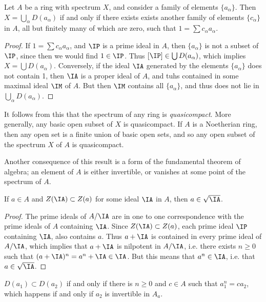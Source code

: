 \begin{lemma}
    Let $A$ be a ring with spectrum $X$, and consider a family of elements $\{ a_\alpha \}$. Then $X = \bigcup_\alpha D(a_\alpha)$ if and only if there exists exists another family of elements $\{ c_\alpha \}$ in $A$, all but finitely many of which are zero, such that $1 = \sum c_\alpha a_\alpha$.
\end{lemma}
\begin{proof}
    If $1 = \sum c_\alpha a_\alpha$, and $\IP$ is a prime ideal in $A$, then $\{ a_\alpha \}$ is not a subset of $\IP$, since then we would find $1 \in \IP$. Thus $[\IP] \in \bigcup D(a_\alpha)$, which implies $X = \bigcup D(a_\alpha)$. Conversely, if the ideal $\IA$ generated by the elements $\{ a_\alpha \}$ does not contain 1, then $\IA$ is a proper ideal of $A$, and tuhs contained in some maximal ideal $\IM$ of $A$. But then $\IM$ contains all $\{ a_\alpha \}$, and thus does not lie in $\bigcup_\alpha D(a_\alpha)$.
\end{proof}

\begin{remark}
    It follows from this that the spectrum of any ring is \emph{quasicompact}. More generally, any basic open subset of $X$ is quasicompact. If $A$ is a Noetherian ring, then any open set is a finite union of basic open sets, and so any open subset of the spectrum $X$ of $A$ is quasicompact. 

    Another consequence of this result is a form of the fundamental theorem of algebra; an element of $A$ is either invertible, or vanishes at some point of the spectrum of $A$.
\end{remark}

\begin{lemma}
    If $a \in A$ and $Z(\IA) \subset Z(a)$ for some ideal $\IA$ in $A$, then $a \in \sqrt{\IA}$.
\end{lemma}
\begin{proof}
    The prime ideals of $A/\IA$ are in one to one correspondence with the prime ideals of $A$ containing $\IA$. Since $Z(\IA) \subset Z(a)$, each prime ideal $\IP$ containing $\IA$, also contains $a$. Thus $a + \IA$ is contained in every prime ideal of $A/\IA$, which implies that $a + \IA$ is nilpotent in $A/\IA$, i.e. there exists $n \geq 0$ such that $(a + \IA)^n = a^n + \IA \in \IA$. But this means that $a^n \in \IA$, i.e. that $a \in \sqrt{\IA}$.
\end{proof}

\begin{corollary}
    $D(a_1) \subset D(a_2)$ if and only if there is $n \geq 0$ and $c \in A$ such that $a_1^n = c a_2$, which happens if and only if $a_2$ is invertible in $A_a$.
\end{corollary}

